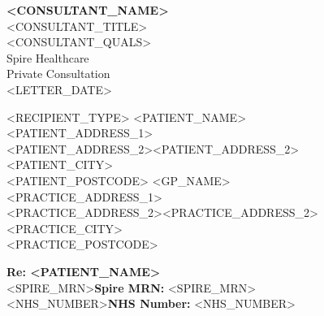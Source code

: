 \documentclass[a4paper,11pt]{letter}
\newcommand{\patientname}{<PATIENT_NAME>}
\newcommand{\patientaddressone}{<PATIENT_ADDRESS_1>}
\newcommand{\patientaddresstwo}{<PATIENT_ADDRESS_2>}
\newcommand{\patientcity}{<PATIENT_CITY>}
\newcommand{\patientpostcode}{<PATIENT_POSTCODE>}
\newcommand{\gpname}{<GP_NAME>}
\newcommand{\practiceaddressone}{<PRACTICE_ADDRESS_1>}
\newcommand{\practiceaddresstwo}{<PRACTICE_ADDRESS_2>}
\newcommand{\practicecity}{<PRACTICE_CITY>}
\newcommand{\practicepostcode}{<PRACTICE_POSTCODE>}
\newcommand{\letterdate}{<LETTER_DATE>}
\newcommand{\spiremrn}{<SPIRE_MRN>}
\newcommand{\nhsnumber}{<NHS_NUMBER>}
\newcommand{\consultantname}{<CONSULTANT_NAME>}
\newcommand{\consultanttitle}{<CONSULTANT_TITLE>}
\newcommand{\consultantqualifications}{<CONSULTANT_QUALS>}
\newcommand{\recipienttype}{<RECIPIENT_TYPE>} %
\begin{document}
\begin{flushright}
    \textbf{\consultantname}\\
    \consultanttitle\\
    \consultantqualifications\\
    \vspace{3mm}
    Spire Healthcare\\
    Private Consultation\\
    \vspace{3mm}
    \letterdate
\end{flushright}

\vspace{10mm}

\noindent
\begin{minipage}[t][45mm][t]{100mm}
    \vspace*{42mm} %
    \hspace*{-5mm} %
    \begin{flushleft}
        \ifx\recipienttype\patienttype
            \patientname\\
            \patientaddressone\\
            \ifx\patientaddresstwo\empty\else\patientaddresstwo\\\fi
            \patientcity\\
            \patientpostcode
        \else
            \gpname\\
            \practiceaddressone\\
            \ifx\practiceaddresstwo\empty\else\practiceaddresstwo\\\fi
            \practicecity\\
            \practicepostcode
        \fi
    \end{flushleft}
\end{minipage}

\vspace{15mm}

\noindent
\textbf{Re: \patientname}\\
\ifx\spiremrn\empty\else\textbf{Spire MRN:} \spiremrn\\\fi
\ifx\nhsnumber\empty\else\textbf{NHS Number:} \nhsnumber\\\fi
\end{document}
